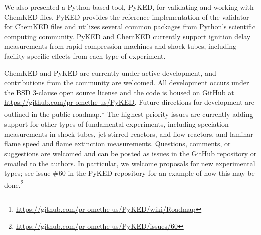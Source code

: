 \documentclass[12pt]{ijck}
\newcommand\ck{ChemKED}
\newcommand\pk{PyKED}
\begin{document}
We also presented a Python-based tool, \pk{}, for validating and working
with \ck{} files. \pk{} provides the reference implementation of the validator
for \ck{} files and utilizes several common packages from Python's scientific
computing community. \pk{} and \ck{} currently support ignition delay
measurements from rapid compression machines and shock tubes, including
facility-specific effects from each type of experiment.

\ck{} and \pk{} are currently under active development, and contributions from the community are
welcomed. All development occurs under the BSD 3-clause open source license and the code is housed
on GitHub at \url{https://github.com/pr-omethe-us/PyKED}. Future directions for development are
outlined in the public roadmap.\footnote{\url{https://github.com/pr-omethe-us/PyKED/wiki/Roadmap}}
The highest priority issues are currently adding support for other types of fundamental experiments,
including speciation measurements in shock tubes, jet-stirred reactors, and flow reactors, and
laminar flame speed and flame extinction measurements. Questions, comments, or suggestions are
welcomed and can be posted as issues in the GitHub repository or emailed to the authors. In
particular, we welcome proposals for new experimental types; see issue \#60 in the \pk{} repository
for an example of how this may be
done.\footnote{\url{https://github.com/pr-omethe-us/PyKED/issues/60}}

\printbibliography
\end{document}
